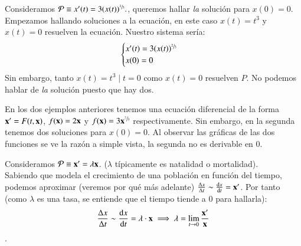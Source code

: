 \begin{eg}\label{eg:no-unic}
    Consideramos $\mathcal{P} \equiv x'(t) = 3(x(t))^{\sfrac{2}{3}}.$, queremos hallar \textit{la} solución para $x(0)=0$.\\
    Empezamos hallando soluciones a la ecuación, en este caso $x(t) = t^3$ y $x(t) = 0$ resuelven la ecuación. Nuestro sistema sería:
    $$
        \begin{cases}
            x'(t) = 3(x(t))^{\sfrac{2}{3}} \\ x(0) = 0
        \end{cases}
    $$
    Sin embargo, tanto $x(t) = t^3 \mid t = 0$ como $x(t) = 0$ resuelven $P$. No podemos hablar de \textit{la} solución puesto que hay dos.
\end{eg}

En los dos ejemplos anteriores tenemos una ecuación diferencial de la forma $\mathbf{x'} = F(t, \mathbf{x})$, $f(\mathbf{x}) = 2\mathbf{x}$ y $f(\mathbf{x}) = 3\mathbf{x}^{\sfrac{2}{3}}$ respectivamente. Sin embargo, en la segunda tenemos dos soluciones para $x(0) = 0$. Al observar las gráficas de las dos funciones se ve la razón a simple vista, la segunda no es derivable en $0$.
\begin{center}
\end{center}

\begin{eg}
    Consideramos $\mathcal{P} \equiv \mathbf{x'} = \lambda \mathbf{x}$. ($\lambda$ típicamente es natalidad o mortalidad).\\
    Sabiendo que modela el crecimiento de una población en función del tiempo, podemos aproximar (veremos por qué más adelante)
    $\frac{\Delta x}{\Delta t} \sim \frac{\mathrm{d}x}{\mathrm{d}t} = \mathbf{x'}$. Por tanto (como $\lambda$ es una tasa, se entiende que el tiempo tiende a 0 para hallarla):
    $$ \frac{\Delta x}{\Delta t}\sim \frac{\mathrm{d}x}{\mathrm{d}t} = \lambda \cdot \mathbf{x} \implies \lambda = \lim_{t \to 0} \frac{\mathbf{x'}}{\mathbf{x}}$$.
\end{eg}

